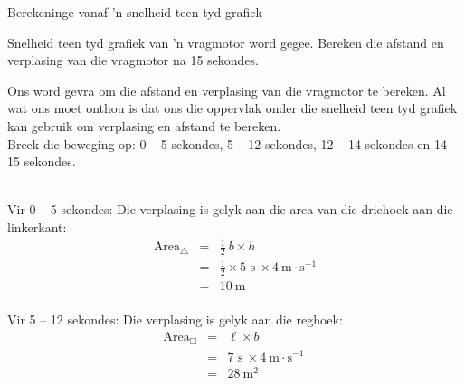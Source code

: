     \noindent 
\begin{wex}{Berekeninge vanaf  'n snelheid teen tyd grafiek}
{Snelheid teen tyd grafiek van  'n vragmotor word gegee. Bereken die afstand en verplasing van die vragmotor na 15 sekondes.
\begin{center}
\end{center}}
{
Ons word gevra om die afstand en verplasing van die vragmotor te bereken. Al wat ons moet onthou is dat ons die oppervlak onder die snelheid teen tyd grafiek kan gebruik om verplasing en afstand te bereken.\\

Breek die beweging op: 0 -- 5 sekondes, 5 -- 12 sekondes, 12 -- 14 sekondes en 14 -- 15 sekondes.\\
\\
\begin{minipage}{0.4\textwidth}
Vir 0 -- 5 sekondes: Die verplasing is gelyk aan die area van die driehoek aan die linkerkant:
\begin{eqnarray*}
\text{Area}_{\triangle} &=& \frac{1}{2}~b \times h\\
&=& \frac{1}{2} \times 5\text{~s}\ \times 4 ~\text{m}\cdot \text{s}^{-1}  \\
&=&10\ \text{m}\\
\end{eqnarray*}
\end{minipage}
\begin{minipage}{0.05\textwidth}
\begin{center}
\end{center}
\end{minipage}
\begin{minipage}{0.4\textwidth}
Vir 5 -- 12 sekondes: Die verplasing is gelyk aan die reghoek:\\
\begin{eqnarray*}
\text{Area}_{\Box} &=& \ell \times b\\
&=&7\text{~s}\ \times 4 ~\text{m}\cdot \text{s}^{-1}\ \\
&=&28\ \text{m}^2\\
\end{eqnarray*}
\end{minipage}

}
\end{wex}
